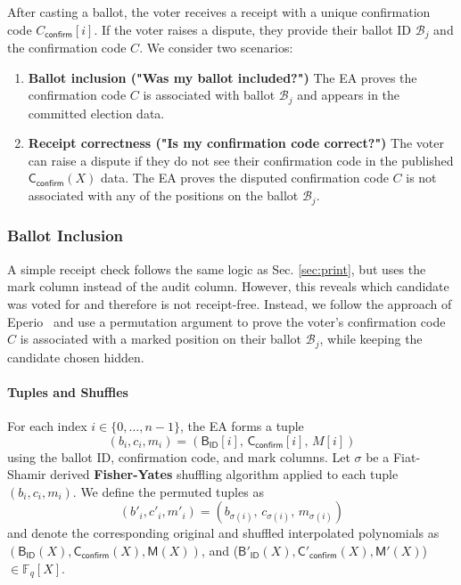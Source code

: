 After casting a ballot, the voter receives a receipt with a unique confirmation code $C_{\mathsf{confirm}}[i]$. 
If the voter raises a dispute, they provide their ballot ID $\mathcal{B}_j$ and the confirmation code $C$.
We consider two scenarios:

\begin{enumerate}
  \item \textbf{Ballot inclusion ("Was my ballot included?")} 
  The EA proves the confirmation code $C$ is associated with ballot $\mathcal{B}_j$ and appears in the committed election data. 
  \item \textbf{Receipt correctness ("Is my confirmation code correct?")}
  The voter can raise a dispute if they do not see their confirmation code in the published $\mathsf{C}_{{\mathsf{confirm}}}(X)$ data.  
  The EA proves the disputed confirmation code $C$ is not associated with any of the positions on the ballot $\mathcal{B}_j$.
\end{enumerate}

\subsubsection{Ballot Inclusion}

A simple receipt check follows the same logic as Sec. \ref{sec:print}, but uses the mark column instead of the audit column. However, this reveals which candidate was voted for and therefore is not receipt-free. 
Instead, we follow the approach of Eperio~\cite{eperio} and use a permutation argument to prove the
voter's confirmation code $C$ is associated with a marked position on their ballot $\mathcal{B}_j$, while
keeping the candidate chosen hidden.

\paragraph{Tuples and Shuffles}\mbox{}\newline
For each index $i \in \{0,\dots,n-1\}$, the EA forms a tuple
\[
  (b_i, c_i, m_i) = (\mathsf{B_{ID}}[i],\, \mathsf{C}_{\mathsf{confirm}}[i],\, M[i])
\]
using the ballot ID, confirmation code, and mark columns. 
Let $\sigma$ be a Fiat-Shamir derived \textbf{Fisher-Yates} shuffling algorithm applied to each tuple $(b_i, c_i, m_i)$. We define the permuted tuples as 
\[
  (b'_i, c'_i, m'_i) = (b_{\sigma(i)},\, c_{\sigma(i)},\, m_{\sigma(i)})
\]
and denote the corresponding original and shuffled interpolated polynomials as \newline$(\mathsf{B}_\mathsf{ID}(X), \mathsf{C}_\mathsf{confirm}(X), \mathsf{M}(X))$, and ($\mathsf{B}'_\mathsf{ID}(X), \mathsf{C}'_\mathsf{confirm}(X), \mathsf{M}'(X)$) $\in \mathbb{F}_q[X]$.


